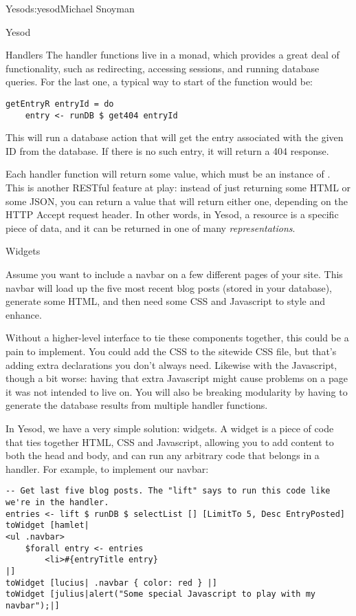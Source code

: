 \begin{aosachapter}{Yesod}{s:yesod}{Michael Snoyman}
\begin{aosasect1}{Yesod}
\begin{aosasect2}{Handlers}
The handler functions live in a  monad, which provides a
great deal of functionality, such as redirecting, accessing sessions,
and running database queries. For the last one, a typical way to start
of the  function would be:

\begin{verbatim}
getEntryR entryId = do
    entry <- runDB $ get404 entryId
\end{verbatim}

This will run a database action that will get the entry associated
with the given ID from the database. If there is no such entry, it
will return a 404 response.

Each handler function will return some value, which must be an
instance of . This is another RESTful feature at play:
instead of just returning some HTML or some JSON, you can return a
value that will return either one, depending on the HTTP Accept
request header. In other words, in Yesod, a resource is a specific
piece of data, and it can be returned in one of many
\emph{representations}.

\end{aosasect2}

\begin{aosasect2}{Widgets}

Assume you want to include a navbar on a few different pages of your
site. This navbar will load up the five most recent blog posts (stored
in your database), generate some HTML, and then need some CSS and
Javascript to style and enhance.

Without a higher-level interface to tie these components together,
this could be a pain to implement. You could add the CSS to the
sitewide CSS file, but that's adding extra declarations you don't
always need. Likewise with the Javascript, though a bit worse: having
that extra Javascript might cause problems on a page it was not
intended to live on. You will also be breaking modularity by having to
generate the database results from multiple handler functions.

In Yesod, we have a very simple solution: widgets. A widget is a piece
of code that ties together HTML, CSS and Javascript, allowing you to
add content to both the head and body, and can run any arbitrary code
that belongs in a handler. For example, to implement our navbar:

\begin{verbatim}
-- Get last five blog posts. The "lift" says to run this code like we're in the handler.
entries <- lift $ runDB $ selectList [] [LimitTo 5, Desc EntryPosted]
toWidget [hamlet|
<ul .navbar>
    $forall entry <- entries
        <li>#{entryTitle entry}
|]
toWidget [lucius| .navbar { color: red } |]
toWidget [julius|alert("Some special Javascript to play with my navbar");|]
\end{verbatim}


\end{aosasect2}
\end{aosasect1}
\end{aosachapter}
